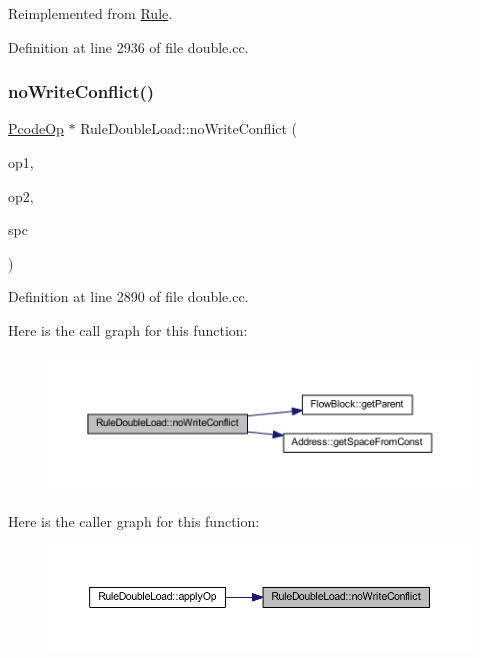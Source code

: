 Reimplemented from \mbox{\hyperlink{class_rule_a4023bfc7825de0ab866790551856d10e}{Rule}}.



Definition at line 2936 of file double.\+cc.

\mbox{\label{class_rule_double_load_abb24d24ca077b4bfe579cbe80b7680f6}} 
\subsubsection{\texorpdfstring{noWriteConflict()}{noWriteConflict()}}
{\footnotesize\ttfamily \mbox{\hyperlink{class_pcode_op}{Pcode\+Op}} $\ast$ Rule\+Double\+Load\+::no\+Write\+Conflict (\begin{DoxyParamCaption}\item[{\mbox{\hyperlink{class_pcode_op}{Pcode\+Op}} $\ast$}]{op1,  }\item[{\mbox{\hyperlink{class_pcode_op}{Pcode\+Op}} $\ast$}]{op2,  }\item[{\mbox{\hyperlink{class_addr_space}{Addr\+Space}} $\ast$}]{spc }\end{DoxyParamCaption})\hspace{0.3cm}{\ttfamily [static]}}



Definition at line 2890 of file double.\+cc.

Here is the call graph for this function\+:
\nopagebreak
\begin{figure}[H]
\begin{center}
\leavevmode
\includegraphics[width=350pt]{class_rule_double_load_abb24d24ca077b4bfe579cbe80b7680f6_cgraph}
\end{center}
\end{figure}
Here is the caller graph for this function\+:
\nopagebreak
\begin{figure}[H]
\begin{center}
\leavevmode
\includegraphics[width=350pt]{class_rule_double_load_abb24d24ca077b4bfe579cbe80b7680f6_icgraph}
\end{center}
\end{figure}


